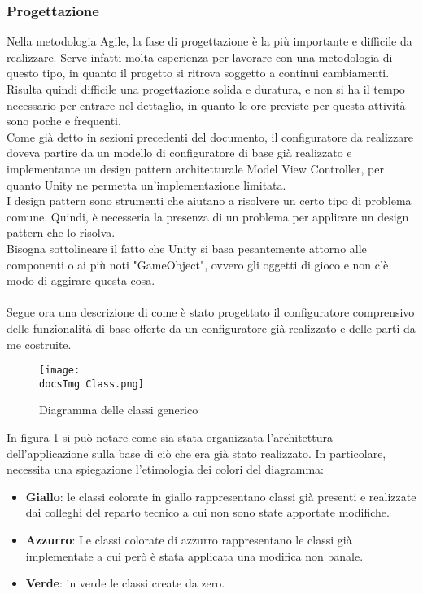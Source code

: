 \subsubsection{Progettazione}
Nella metodologia Agile, la fase di progettazione \`e la pi\`u importante e difficile da realizzare. Serve infatti molta esperienza per lavorare con una metodologia di questo tipo, in quanto il progetto si ritrova soggetto a continui cambiamenti. Risulta quindi difficile una progettazione solida e duratura, e non si ha il tempo necessario per entrare nel dettaglio, in quanto le ore previste per questa attivit\`a sono poche e frequenti.\\
Come gi\`a detto in sezioni precedenti del documento, il configuratore da realizzare doveva partire da un modello di configuratore di base gi\`a realizzato e implementante un design pattern architetturale Model View Controller, per quanto Unity ne permetta un'implementazione limitata.\\
I design pattern sono strumenti che aiutano a risolvere un certo tipo di problema comune. Quindi, \`e necesseria la presenza di un problema per applicare un design pattern che lo risolva.\\
Bisogna sottolineare il fatto che Unity si basa pesantemente attorno alle componenti o ai pi\`u noti "GameObject", ovvero gli oggetti di gioco e non c'\`e modo di aggirare questa cosa.\\\\
Segue ora una descrizione di come \`e stato progettato il configuratore comprensivo delle funzionalit\`a di base offerte da un configuratore gi\`a realizzato e delle parti da me costruite.\\


\begin{figure}[H]
	\centering
	\texttt{[image: \\docsImg Class.png]}
	\caption{Diagramma delle classi generico}
	\label{fig:Diagramma delle classi}
\end{figure}
\newpage

In figura \ref{fig:Diagramma delle classi} si pu\`o notare come sia stata organizzata l'architettura dell'applicazione sulla base di ci\`o che era gi\`a stato realizzato. In particolare, necessita una spiegazione l'etimologia dei colori del diagramma:

\begin{itemize}
	\item \textbf{Giallo}: le classi colorate in giallo rappresentano classi gi\`a presenti e realizzate dai colleghi del reparto tecnico a cui non sono state apportate modifiche.
	\item \textbf{Azzurro}: Le classi colorate di azzurro rappresentano le classi gi\`a implementate a cui per\`o \`e stata applicata una modifica non banale.
	\item \textbf{Verde}: in verde le classi create da zero.
\end{itemize}


